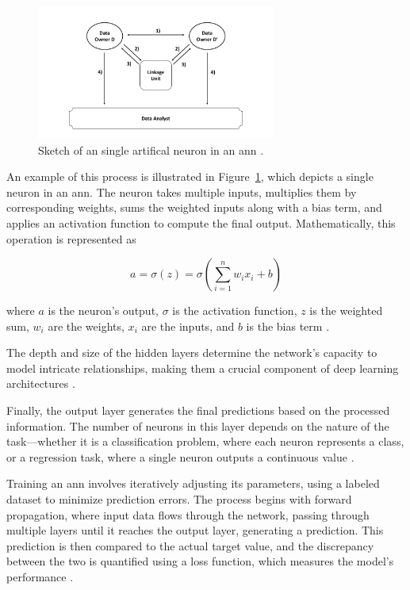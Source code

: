\begin{figure}[H]
  \centering
  \includegraphics[width=0.7\textwidth, page=17]{img/visualization.pdf}
  \caption{Sketch of an single artifical neuron in an \ac{ann} \cite{neuronimage}.}
  \label{fig:neuronexample}
\end{figure}

An example of this process is illustrated in Figure~\ref{fig:neuronexample}, which depicts a single neuron in an \ac{ann}.
The neuron takes multiple inputs, multiplies them by corresponding weights, sums the weighted inputs along with a bias term, and applies an activation function to compute the final output.
Mathematically, this operation is represented as

\begin{equation}
  a = \sigma(z) = \sigma\left(\sum_{i=1}^{n} w_i x_i + b\right)
\end{equation}

where \(a\) is the neuron’s output, \(\sigma\) is the activation function, \(z\) is the weighted sum, \(w_i\) are the weights, \(x_i\) are the inputs, and \(b\) is the bias term \cite{neuronimage}.

The depth and size of the hidden layers determine the network's capacity to model intricate relationships, making them a crucial component of deep learning architectures \cite{dongare2012introduction}.

Finally, the output layer generates the final predictions based on the processed information.
The number of neurons in this layer depends on the nature of the task—whether it is a classification problem, where each neuron represents a class, or a regression task, where a single neuron outputs a continuous value \cite{dongare2012introduction}.

Training an \ac{ann} involves iteratively adjusting its parameters, using a labeled dataset to minimize prediction errors.
The process begins with forward propagation, where input data flows through the network, passing through multiple layers until it reaches the output layer, generating a prediction.
This prediction is then compared to the actual target value, and the discrepancy between the two is quantified using a loss function, which measures the model's performance \cite{russell2016artificial}.

